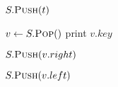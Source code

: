 
\begin{algorithm}[H]
  \begin{algorithmic}[]
      \State $S.\Call{Push}{t}$ 

      \Statex
	\State $v \gets S.\Call{Pop}{\null}$
	\State print $v.key$

	\Statex
	  \State $S.\Call{Push}{v.right}$
	\EndIf

	  \State $S.\Call{Push}{v.left}$
	\EndIf
      \EndWhile
    \EndProcedure

    \Statex
    \State {}
  \end{algorithmic}
\end{algorithm}
